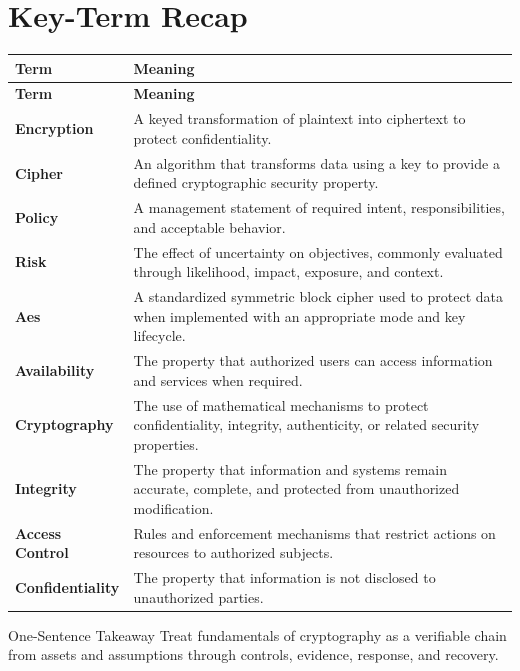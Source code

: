 \documentclass[11pt,letterpaper]{article}
\begin{document}
\section*{Key-Term Recap}
\begin{longtable}{>{\raggedright\arraybackslash}p{}>{\raggedright\arraybackslash}p{}}
\toprule\rowcolor{Navy}\color{white}\textbf{Term} & \color{white}\textbf{Meaning}\\\midrule
\endfirsthead
\toprule\rowcolor{Navy}\color{white}\textbf{Term} & \color{white}\textbf{Meaning}\\\midrule
\endhead
\textbf{Encryption} & A keyed transformation of plaintext into ciphertext to protect confidentiality. \\\midrule
\textbf{Cipher} & An algorithm that transforms data using a key to provide a defined cryptographic security property. \\\midrule
\textbf{Policy} & A management statement of required intent, responsibilities, and acceptable behavior. \\\midrule
\textbf{Risk} & The effect of uncertainty on objectives, commonly evaluated through likelihood, impact, exposure, and context. \\\midrule
\textbf{Aes} & A standardized symmetric block cipher used to protect data when implemented with an appropriate mode and key lifecycle. \\\midrule
\textbf{Availability} & The property that authorized users can access information and services when required. \\\midrule
\textbf{Cryptography} & The use of mathematical mechanisms to protect confidentiality, integrity, authenticity, or related security properties. \\\midrule
\textbf{Integrity} & The property that information and systems remain accurate, complete, and protected from unauthorized modification. \\\midrule
\textbf{Access Control} & Rules and enforcement mechanisms that restrict actions on resources to authorized subjects. \\\midrule
\textbf{Confidentiality} & The property that information is not disclosed to unauthorized parties. \\\midrule
\bottomrule
\end{longtable}
\begin{CornellExamBox}{One-Sentence Takeaway}
Treat fundamentals of cryptography as a verifiable chain from assets and assumptions through controls, evidence, response, and recovery.
\end{CornellExamBox}
\end{document}
